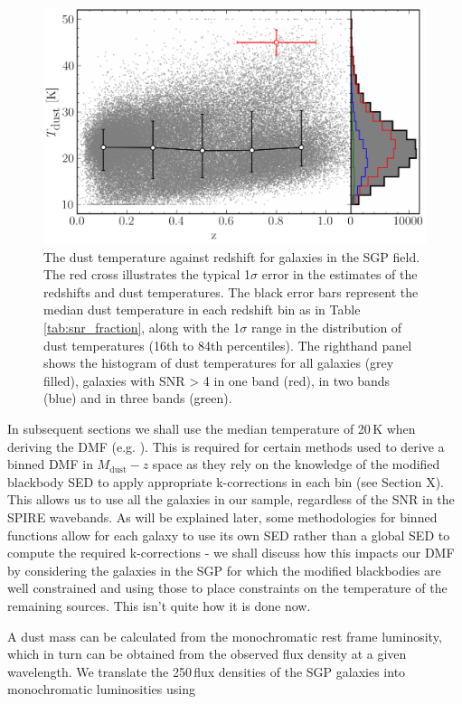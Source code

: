\begin{figure}
	\centering
	\includegraphics[width=0.75\columnwidth]{Figures/dust_temperatures.pdf}
	\caption{The dust temperature against redshift for galaxies in the SGP field. The red cross illustrates the typical 1$\sigma$ error in the estimates of the redshifts and dust temperatures. The black error bars represent the median dust temperature in each redshift bin as in Table \ref{tab:snr_fraction}, along with the 1$\sigma$ range in the distribution of dust temperatures (16th to 84th percentiles). The righthand panel shows the histogram of dust temperatures for all galaxies (grey filled), galaxies with SNR > 4 in one band (red), in two bands (blue) and in three bands (green).}
	\label{fig:dust_temperatures}
\end{figure}

In subsequent sections we shall use the median temperature of 20\,K when deriving the DMF (e.g. \citealt{Vlahakis_2005}). This is required for certain methods used to derive a binned DMF in $M_{\textrm{dust}}-z$ space as they rely on the knowledge of the modified blackbody SED to apply appropriate k-corrections in each bin (see Section {\color{red} X}). This allows us to use all the galaxies in our sample, regardless of the SNR in the SPIRE wavebands. As will be explained later, some methodologies for binned functions allow for each galaxy to use its own SED rather than a global SED to compute the required k-corrections - we shall discuss how this impacts our DMF by considering the galaxies in the SGP for which the modified blackbodies are well constrained and using those to place constraints on the temperature of the remaining sources. {\color{red} This isn't quite how it is done now.}

A dust mass can be calculated from the monochromatic rest frame luminosity, which in turn can be obtained from the observed flux density at a given wavelength. We translate the 250\,\micron flux densities of the SGP galaxies into monochromatic luminosities using

